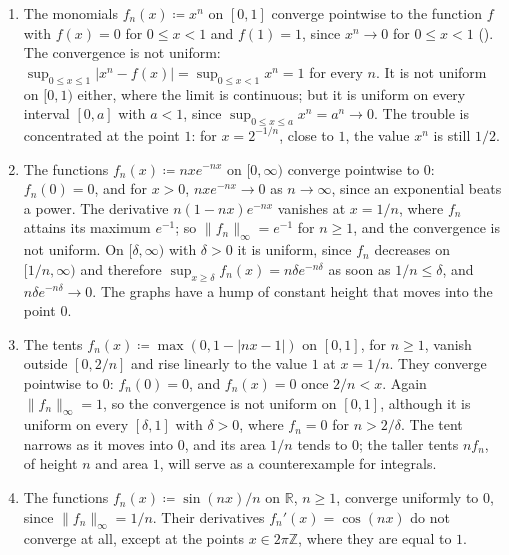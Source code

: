 \begin{enumerate}
\item The monomials $f_n(x)\coloneqq x^n$ on $[0,1]$ converge pointwise to the function $f$ with $f(x)=0$ for $0\le x<1$ and $f(1)=1$, since $x^n\to0$ for $0\le x<1$ (). The convergence is not uniform: $\sup_{0\le x\le1}|x^n-f(x)|=\sup_{0\le x<1}x^n=1$ for every $n$. It is not uniform on $[0,1)$ either, where the limit is continuous; but it is uniform on every interval $[0,a]$ with $a<1$, since $\sup_{0\le x\le a}x^n=a^n\to0$. The trouble is concentrated at the point $1$: for $x=2^{-1/n}$, close to $1$, the value $x^n$ is still $1/2$.
\item The functions $f_n(x)\coloneqq nxe^{-nx}$ on $[0,\infty)$ converge pointwise to $0$: $f_n(0)=0$, and for $x>0$, $nxe^{-nx}\to0$ as $n\to\infty$, since an exponential beats a power. The derivative $n(1-nx)e^{-nx}$ vanishes at $x=1/n$, where $f_n$ attains its maximum $e^{-1}$; so $\|f_n\|_\infty=e^{-1}$ for $n\ge1$, and the convergence is not uniform. On $[\delta,\infty)$ with $\delta>0$ it is uniform, since $f_n$ decreases on $[1/n,\infty)$ and therefore $\sup_{x\ge\delta}f_n(x)=n\delta e^{-n\delta}$ as soon as $1/n\le\delta$, and $n\delta e^{-n\delta}\to0$. The graphs have a hump of constant height that moves into the point $0$.
\item The tents $f_n(x)\coloneqq\max(0,1-|nx-1|)$ on $[0,1]$, for $n\ge1$, vanish outside $[0,2/n]$ and rise linearly to the value $1$ at $x=1/n$. They converge pointwise to $0$: $f_n(0)=0$, and $f_n(x)=0$ once $2/n<x$. Again $\|f_n\|_\infty=1$, so the convergence is not uniform on $[0,1]$, although it is uniform on every $[\delta,1]$ with $\delta>0$, where $f_n=0$ for $n>2/\delta$. The tent narrows as it moves into $0$, and its area $1/n$ tends to $0$; the taller tents $nf_n$, of height $n$ and area $1$, will serve as a counterexample for integrals.
\item The functions $f_n(x)\coloneqq\sin(nx)/n$ on $\mathbb R$, $n\ge1$, converge uniformly to $0$, since $\|f_n\|_\infty=1/n$. Their derivatives $f_n'(x)=\cos(nx)$ do not converge at all, except at the points $x\in2\pi\mathbb Z$, where they are equal to $1$.
\end{enumerate}

